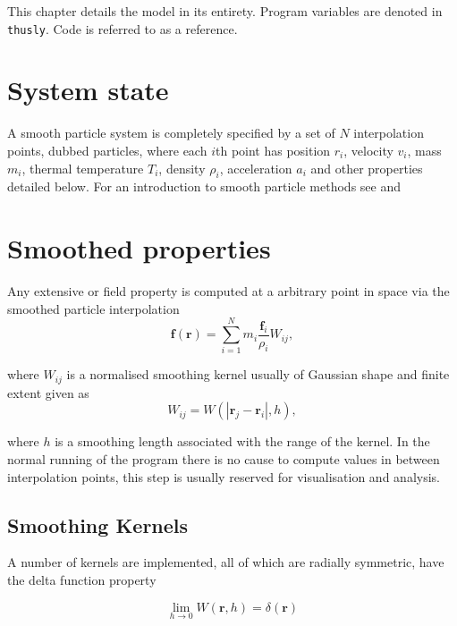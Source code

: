 This chapter details the model in its entirety. Program variables are denoted
in \texttt{thusly}. Code is referred to as a reference.


\section{System state}
A smooth particle system is completely specified by a set of $N$ interpolation
points, dubbed particles, where each $i$th point has position $r_{i}$, velocity
$v_{i}$, mass $m_{i}$, thermal temperature $T_{i}$, density $\rho_{i}$,
acceleration $a_{i}$ and other properties detailed below. For an introduction
to smooth particle methods see \cite[]{hoover_smooth_2006} and
\cite[]{liu_smoothed_2003}

\section{Smoothed properties} Any extensive or field property is computed at a
arbitrary point in space via the smoothed particle interpolation
\begin{equation}
\label{particleapprox}
\mathbold{f} \left( \mathbold{r} \right)  = \sum^{N}_{i=1} m_{i}
\frac{\mathbold{f}_{i}}{\rho_{i}}W_{ij}, 
\end{equation}

where  $W_{ij}$ is a normalised smoothing kernel usually of Gaussian shape and
finite extent given as
\begin{equation}
\label{kernel_shorthand}
 W_{ij}=W(| \mathbold{r}_{j}-\mathbold{r}_{i} |,h),
\end{equation}

where $h$ is a smoothing length associated with the range of the kernel.
In the normal running of the program there is no cause to compute values in
between interpolation points, this step is usually reserved for visualisation
and analysis.


\subsection{Smoothing Kernels}
A number of kernels are implemented, all of which are radially symmetric, have
the delta function property 

\[ \lim_{h\rightarrow0} W(\mathbold{r},h) = \delta(\mathbold{r}) \] 


